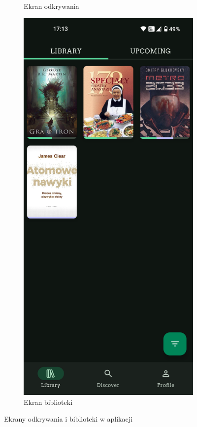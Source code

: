 \documentclass[12pt,twoside]{article}
\begin{document}
\begin{figure}[ht]
\begin{subfigure}[b]{0.48\textwidth}
        \caption{Ekran odkrywania}
    \end{subfigure}
    \hfill
    \begin{subfigure}[b]{0.48\textwidth}
        \includegraphics[width=\textwidth]{figures/library.png}
        \caption{Ekran biblioteki}
    \end{subfigure}
    \caption{Ekrany odkrywania i biblioteki w aplikacji}
    \label{fig:libraryDiscover}
\end{figure}
\end{document}
